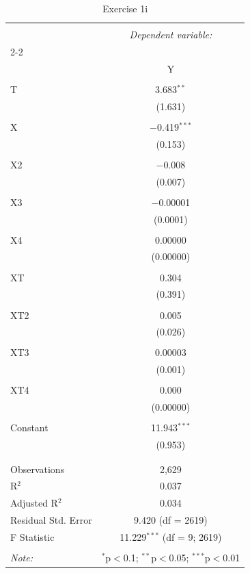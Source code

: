 
\begin{table}[!htbp] \centering 
  \caption{Exercise 1i} 
  \label{} 
\begin{tabular}{@{\extracolsep{5pt}}lc} 
\\[-1.8ex]\hline 
\hline \\[-1.8ex] 
 & \multicolumn{1}{c}{\textit{Dependent variable:}} \\ 
\cline{2-2} 
\\[-1.8ex] & Y \\ 
\hline \\[-1.8ex] 
 T & 3.683$^{**}$ \\ 
  & (1.631) \\ 
  & \\ 
 X & $-$0.419$^{***}$ \\ 
  & (0.153) \\ 
  & \\ 
 X2 & $-$0.008 \\ 
  & (0.007) \\ 
  & \\ 
 X3 & $-$0.00001 \\ 
  & (0.0001) \\ 
  & \\ 
 X4 & 0.00000 \\ 
  & (0.00000) \\ 
  & \\ 
 XT & 0.304 \\ 
  & (0.391) \\ 
  & \\ 
 XT2 & 0.005 \\ 
  & (0.026) \\ 
  & \\ 
 XT3 & 0.00003 \\ 
  & (0.001) \\ 
  & \\ 
 XT4 & 0.000 \\ 
  & (0.00000) \\ 
  & \\ 
 Constant & 11.943$^{***}$ \\ 
  & (0.953) \\ 
  & \\ 
\hline \\[-1.8ex] 
Observations & 2,629 \\ 
R$^{2}$ & 0.037 \\ 
Adjusted R$^{2}$ & 0.034 \\ 
Residual Std. Error & 9.420 (df = 2619) \\ 
F Statistic & 11.229$^{***}$ (df = 9; 2619) \\ 
\hline 
\hline \\[-1.8ex] 
\textit{Note:}  & \multicolumn{1}{r}{$^{*}$p$<$0.1; $^{**}$p$<$0.05; $^{***}$p$<$0.01} \\ 
\end{tabular} 
\end{table} 

